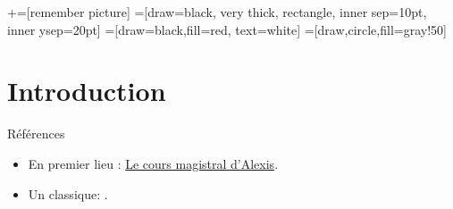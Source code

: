 \usetikzlibrary{positioning}
\usetikzlibrary{snakes}
\usetikzlibrary{calc}
\usetikzlibrary{arrows}
\usetikzlibrary{decorations.markings}
\usetikzlibrary{shapes.misc}
\usetikzlibrary{matrix,shapes,arrows,fit,tikzmark}
\usetikzlibrary{matrix,chains,positioning,decorations.pathreplacing,arrows}
\usetikzlibrary{shapes}
\usetikzlibrary{shapes.geometric, arrows}
\newcommand\marktopleft[1]{
    \tikz[overlay,remember picture] 
        \node (marker-#1-a) at (-.3em,.3em) {};%
}
\newcommand\markbottomright[2]{%
    \tikz[overlay,remember picture] 
        \node (marker-#1-b) at (0em,0em) {};%
}
+=[remember picture] 
 =[draw=black, very thick, rectangle, inner sep=10pt, inner ysep=20pt]
 =[draw=black,fill=red, text=white]
=[draw,circle,fill=gray!50]

\begin{frame}
\titlepage
\end{frame}
\begin{frame}
 \tableofcontents
    \end{frame}

\section{Introduction}
\frame{\sectionpage}

\begin{frame}
  [allowframebreaks]{Références}
  \begin{itemize}
\item En premier lieu : \href{https://cours.univ-grenoble-alpes.fr/course/view.php?id=5945\#section-2}{Le cours magistral d'Alexis}.
\item Un classique: \cite{Tirole_BookIO_1988}.
\end{itemize}

\end{frame}

